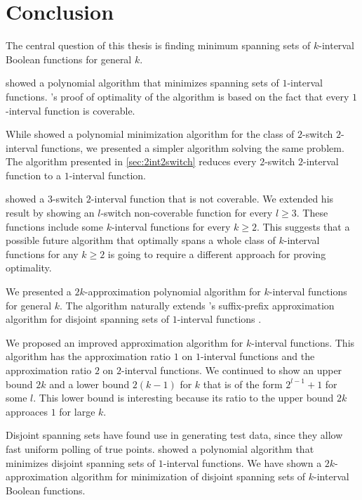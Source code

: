 \chapter*{Conclusion}


The central question of this thesis
is finding minimum spanning sets
of $k$-interval Boolean functions
for general $k$.

\citeauthor{Schieber2005154} showed a polynomial algorithm
that minimizes spanning sets of $1$-interval functions.
\citeauthor{Schieber2005154}'s proof of optimality
of the algorithm
is based on the fact that every $1$-interval function
is coverable.

While \citeauthor{Dubovsky2012} showed
a polynomial minimization algorithm
for the class of $2$-switch $2$-interval functions,
we presented a simpler algorithm
solving the same problem.
The algorithm presented in \cref{sec:2int2switch}
reduces every $2$-switch $2$-interval function
to a $1$-interval function.

\citeauthor{Dubovsky2012} showed
a $3$-switch $2$-interval function
that is not coverable.
We extended his result by showing
an $l$-switch non-coverable function for every $l \geq 3$.
These functions include some $k$-interval functions
for every $k \geq 2$.
This suggests that a possible future algorithm
that optimally spans a whole class
of $k$-interval functions
for any $k \geq 2$
is going to require a different approach
for proving optimality.

We presented a $2k$-approximation polynomial algorithm
for $k$-interval functions for general $k$.
The algorithm naturally extends
\citeauthor{Schieber2005154}'s suffix-prefix
approximation algorithm
for disjoint spanning sets of $1$-interval functions
\citep[section 6]{Schieber2005154}.

We proposed an improved approximation algorithm
for $k$-interval functions.
This algorithm has the approximation ratio $1$
on $1$-interval functions
and the approximation ratio $2$
on $2$-interval functions.
We continued to show an upper bound $2k$
and a lower bound $2(k-1)$
for $k$ that is of the form $2^{l-1}+1$ for some $l$.
This lower bound is interesting
because its ratio to the upper bound $2k$ approaces $1$
for large $k$.

Disjoint spanning sets have found use in generating test data,
since they allow fast uniform polling of true points.
\citeauthor{Schieber2005154} showed
a polynomial algorithm that minimizes
disjoint spanning sets
of $1$-interval functions.
We have shown a $2k$-approximation algorithm
for minimization of disjoint spanning sets of $k$-interval Boolean functions.

